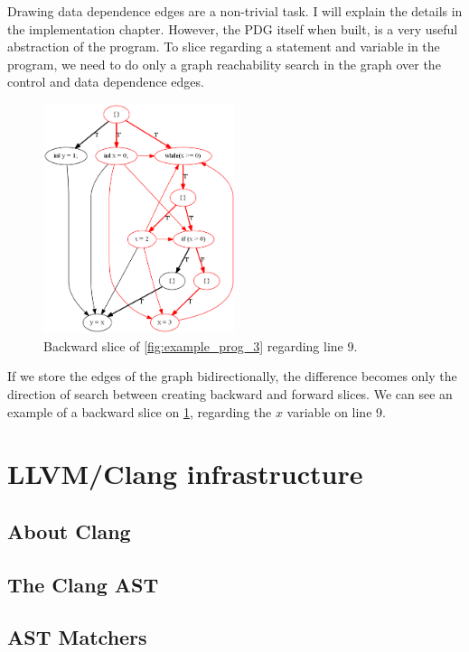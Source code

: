 \documentclass[oneside,12pt,a4paper]{book}
\begin{document}
Drawing data dependence edges are a non-trivial task. I will explain the details in the implementation chapter. However, the PDG itself when built, is a very useful abstraction of the program. To slice regarding a statement and variable in the program, we need to do only a graph reachability search in the graph over the control and data dependence edges. 
\begin{figure}
\includegraphics[width=0.5\textwidth]{loop_carried_test_backward_slice}
\caption{Backward slice of \ref{fig:example_prog_3} regarding line 9.}
\label{fig:example_prog_3_backward_slice}
\end{figure}
If we store the edges of the graph bidirectionally, the difference becomes only the direction of search between creating backward and forward slices. We can see an example of a backward slice on \ref{fig:example_prog_3_backward_slice}, regarding the $x$ variable on line 9.


\chapter{LLVM/Clang infrastructure}
\section{About Clang}












\section{The Clang AST}
\section{AST Matchers}
\end{document}

